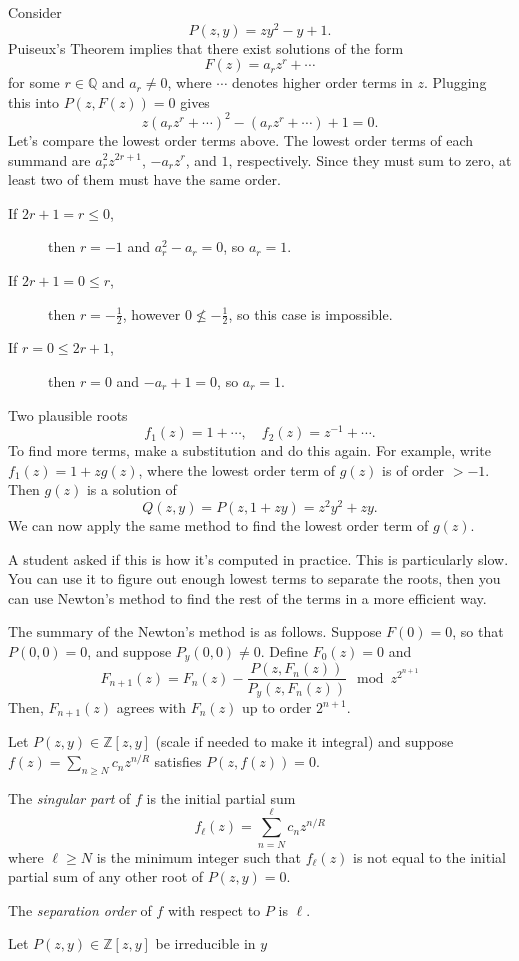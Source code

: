 \begin{example}
    Consider
    \[
        P(z, y) = zy^2 - y + 1.
    \]
    Puiseux's Theorem implies that there exist solutions of the form
    \[
        F(z) = a_r z^r + \cdots
    \]
    for some \(r \in \mathbb{Q}\) and \(a_r \neq 0\), where \(\cdots\) denotes higher order terms in \(z\).
    Plugging this into \(P(z, F(z)) = 0\) gives
    \[
        z(a_r z^r + \cdots)^2 - (a_r z^r + \cdots) + 1 = 0.
    \]
    Let's compare the lowest order terms above.
    The lowest order terms of each summand are \(a_r^2 z^{2r + 1}\), \(-a_r z^r\), and \(1\), respectively.
    Since they must sum to zero, at least two of them must have the same order.
    \begin{description}
        \item[\boldmath If \(2r + 1 = r \leq 0\),] then \(r = -1\) and \(a_r^2 - a_r = 0\), so \(a_r = 1\).
        \item[\boldmath If \(2r + 1 = 0 \leq r\),] then \(r = -\frac{1}{2}\), however \(0 \not\leq -\frac{1}{2}\), so this case is impossible.
        \item[\boldmath If \(r = 0 \leq 2r + 1\),] then \(r = 0\) and \(-a_r + 1 = 0\), so \(a_r = 1\).
    \end{description}
    Two plausible roots
    \[
        f_1(z) = 1 + \cdots, \quad f_2(z) = z^{-1} + \cdots.
    \]
    To find more terms, make a substitution and do this again.
    For example, write \(f_1(z) = 1 + z g(z)\), where the lowest order term of \(g(z)\) is of order \(> -1\).
    Then \(g(z)\) is a solution of
    \[
        Q(z, y) = P(z, 1 + z y) = z^2 y^2 + z y.
    \]
    We can now apply the same method to find the lowest order term of \(g(z)\).
\end{example}

A student asked if this is how it's computed in practice.
This is particularly slow.
You can use it to figure out enough lowest terms to separate the roots, then you can use Newton's method to find the rest of the terms in a more efficient way.

The summary of the Newton's method is as follows.
Suppose \(F(0) = 0\), so that \(P(0, 0) = 0\), and suppose \(P_y(0, 0) \neq 0\).
Define \(F_0(z) = 0\) and
\[
    F_{n+1}(z) = F_n(z) - \frac{P(z, F_n(z))}{P_y(z, F_n(z))} \mod z^{2^{n+1}}
\]
Then, \(F_{n+1}(z)\) agrees with \(F_n(z)\) up to order \(2^{n+1}\).

Let \(P(z, y) \in \mathbb{Z}[z, y]\) (scale if needed to make it integral) and suppose \(f(z) = \sum_{n \geq N} c_n z^{n/R}\) satisfies \(P(z, f(z)) = 0\).

The \emph{singular part} of \(f\) is the initial partial sum
\[
    f_\ell(z) = \sum_{n = N}^{\ell} c_n z^{n/R}
\]
where \(\ell \geq N\) is the minimum integer such that \(f_\ell(z)\) is not equal to the initial partial sum of any other root of \(P(z, y) = 0\).

The \emph{separation order} of \(f\) with respect to \(P\) is \(\ell\).

\begin{proposition}
    Let \(P(z, y) \in \mathbb{Z}[z, y]\) be irreducible in \(y\) 
\end{proposition}